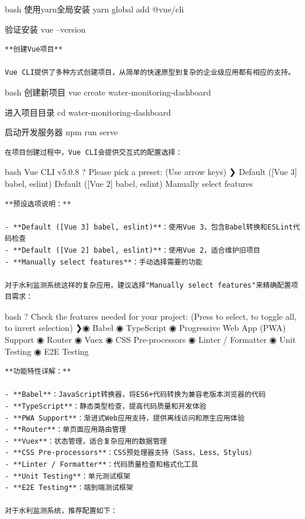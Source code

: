 {{bash  使用yarn全局安装 yarn global add @vue/cli

 验证安装 vue --version

\begin{lstlisting}
**创建Vue项目**

Vue CLI提供了多种方式创建项目，从简单的快速原型到复杂的企业级应用都有相应的支持。
\end{lstlisting}

bash  创建新项目 vue create water-monitoring-dashboard

 进入项目目录 cd water-monitoring-dashboard

 启动开发服务器 npm run serve

\begin{lstlisting}
在项目创建过程中，Vue CLI会提供交互式的配置选择：
\end{lstlisting}

bash Vue CLI v5.0.8 ? Please pick a preset: (Use arrow keys) ❯ Default ({[}Vue 3{]} babel, eslint) Default ({[}Vue 2{]} babel, eslint) Manually select features

\begin{lstlisting}
**预设选项说明：**

- **Default ([Vue 3] babel, eslint)**：使用Vue 3，包含Babel转换和ESLint代码检查
- **Default ([Vue 2] babel, eslint)**：使用Vue 2，适合维护旧项目
- **Manually select features**：手动选择需要的功能

对于水利监测系统这样的复杂应用，建议选择"Manually select features"来精确配置项目需求：
\end{lstlisting}

bash ? Check the features needed for your project: (Press to select, to toggle all, to invert selection) ❯◉ Babel ◉ TypeScript ◉ Progressive Web App (PWA) Support ◉ Router ◉ Vuex ◉ CSS Pre-processors ◉ Linter / Formatter ◉ Unit Testing ◉ E2E Testing

\begin{lstlisting}
**功能特性详解：**

- **Babel**：JavaScript转换器，将ES6+代码转换为兼容老版本浏览器的代码
- **TypeScript**：静态类型检查，提高代码质量和开发体验
- **PWA Support**：渐进式Web应用支持，提供离线访问和原生应用体验
- **Router**：单页面应用路由管理
- **Vuex**：状态管理，适合复杂应用的数据管理
- **CSS Pre-processors**：CSS预处理器支持（Sass、Less、Stylus）
- **Linter / Formatter**：代码质量检查和格式化工具
- **Unit Testing**：单元测试框架
- **E2E Testing**：端到端测试框架

对于水利监测系统，推荐配置如下：
\end{lstlisting}

}}
